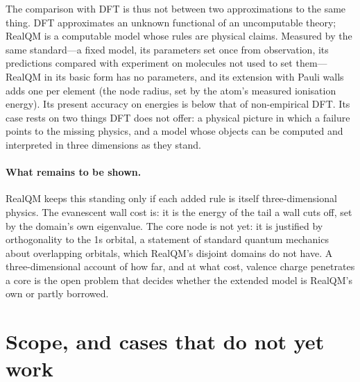 \documentclass[11pt]{article}
\begin{document}
The comparison with DFT is thus not between two approximations to the same thing. DFT approximates an
unknown functional of an uncomputable theory; RealQM is a computable model whose rules are physical
claims. Measured by the same standard---a fixed model, its parameters set once from observation, its
predictions compared with experiment on molecules not used to set them---RealQM in its basic form has
no parameters, and its extension with Pauli walls adds one per element (the node radius, set by the
atom's measured ionisation energy). Its present accuracy on energies is below that of non-empirical
DFT. Its case rests on two things DFT does not offer: a physical picture in which a failure points to
the missing physics, and a model whose objects can be computed and interpreted in three dimensions as
they stand.

\paragraph{What remains to be shown.}
RealQM keeps this standing only if each added rule is itself three-dimensional physics. The
evanescent wall cost is: it is the energy of the tail a wall cuts off, set by the domain's own
eigenvalue. The core node is not yet: it is justified by orthogonality to the 1s orbital, a statement
of standard quantum mechanics about overlapping orbitals, which RealQM's disjoint domains do not have.
A three-dimensional account of how far, and at what cost, valence charge penetrates a core is the open
problem that decides whether the extended model is RealQM's own or partly borrowed.

\section{Scope, and cases that do not yet work}
\label{sec:limits}
\label{sec:open}
\end{document}
